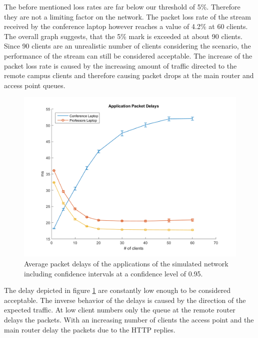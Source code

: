 \documentclass[
10pt, %
a4paper, %
oneside, %
headinclude,footinclude, %
BCOR5mm, %
]{scrartcl}
\begin{document}
The before mentioned loss rates are far below our threshold of 5\%. Therefore they are not a limiting factor on the network. The packet loss rate of the stream received by the conference laptop however reaches a value of 4.2\% at 60 clients. The overall graph suggests, that the 5\% mark is exceeded at about 90 clients. Since 90 clients are an unrealistic number of clients considering the scenario, the performance of the stream can still be considered acceptable. The increase of the packet loss rate is caused by the increasing amount of traffic directed to the remote campus clients and therefore causing packet drops at the main router and access point queues.
\begin{figure}[!ht]
  \centering
  \includegraphics[width=\textwidth]{Figures/cctv/Application_Packet_Delays.png}
  \caption{Average packet delays of the applications of the simulated network including confidence intervals at a confidence level of 0.95.} \label{fig:cctv_app_packet_delays}
\end{figure}

The delay depicted in figure \ref{fig:cctv_app_packet_delays} are constantly low enough to be considered acceptable. The inverse behavior of the delays is caused by the direction of the expected traffic. At low client numbers only the queue at the remote router delays the packets. With an increasing number of clients the access point and the main router delay the packets due to the HTTP replies.
\end{document}
